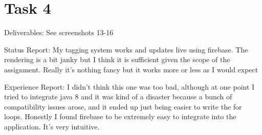\documentclass{article}
\begin{document}
\clearpage
\section{Task 4}
Deliverables: See screenshots 13-16

Status Report: My tagging system works and updates live using firebase. The rendering is a bit janky but I think it is sufficient given the scope of the assignment. Really it's nothing fancy but it works more or less as I would expect

Experience Report: I didn't think this one was too bad, although at one point I tried to integrate java 8 and it was kind of a disaster because a bunch of compatibility issues arose, and it ended up just being easier to write the for loops. Honestly I found firebase to be extremely easy to integrate into the application. It's very intuitive.
\end{document}
